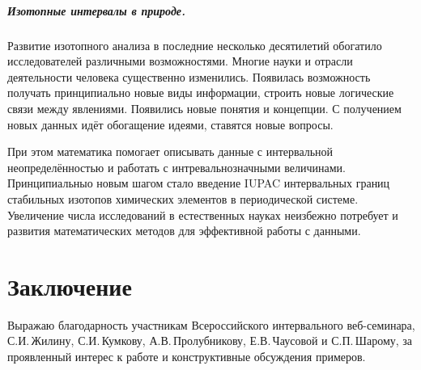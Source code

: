 \documentclass[a5paper,openany]{book}
\begin{document}
\paragraph{Изотопные интервалы в природе.}

Развитие изотопного анализа в последние несколько десятилетий обогатило исследователей различными возможностями. Многие науки и отрасли деятельности человека существенно изменились. Появилась возможность получать принципиально новые виды информации, строить новые логические связи между явлениями. Появились новые понятия  и концепции. С получением новых данных идёт обогащение идеями, ставятся новые вопросы.

При этом математика помогает описывать данные с интервальной неопределённостью  и работать с интревальнозначными величинами. Принципиальныо новым шагом стало введение IUPAC интервальных границ стабильных изотопов химических элементов в периодической системе.  Увеличение числа исследований в естественных науках неизбежно потребует и развития математических методов для  эффективной работы с данными. 


\chapter*{Заключение}\label{Conclusion}


Выражаю благодарность участникам Всероссийского интервального веб-семинара, С.И.\,Жилину, С.И.\,Кумкову, А.В.\,Пролубникову, Е.В.\,Чаусовой  и С.П.\,Шарому, за проявленный интерес к работе и конструктивные обсуждения примеров. 
\end{document}

